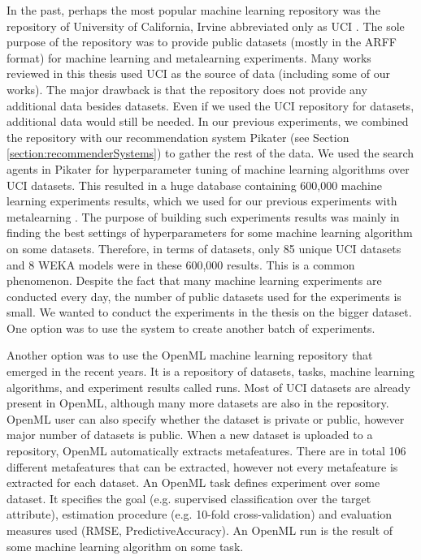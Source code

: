 In the past, perhaps the most popular machine learning repository was the repository of University of California, Irvine abbreviated only as UCI \cite{uci}. The sole purpose of the repository was to provide public datasets (mostly in the ARFF format) for machine learning and metalearning experiments. Many works reviewed in this thesis used UCI as the source of data (including some of our works). The major drawback is that the repository does not provide any additional data besides datasets. Even if we used the UCI repository for datasets, additional data would still be needed. In our previous experiments, we combined the repository with our recommendation system Pikater (see Section \ref{section:recommenderSystems}) to gather the rest of the data. We used the search agents in Pikater for hyperparameter tuning of machine learning algorithms over UCI datasets. This resulted in a huge database containing 600,000 machine learning experiments results, which we used for our previous experiments with metalearning \cite{SSCI2014}. The purpose of building such experiments results was mainly in finding the best settings of hyperparameters for some machine learning algorithm on some datasets. Therefore, in terms of datasets, only 85 unique UCI datasets and 8 WEKA models were in these 600,000 results. This is a common phenomenon. Despite the fact that many machine learning experiments are conducted every day, the number of public datasets used for the experiments is small. We wanted to conduct the experiments in the thesis on the bigger dataset. One option was to use the system to create another batch of experiments.

Another option was to use the OpenML \cite{openMl} machine learning repository that emerged in the recent years. It is a repository of datasets, tasks, machine learning algorithms, and experiment results called runs. Most of UCI datasets are already present in OpenML, although many more datasets are also in the repository. OpenML user can also specify whether the dataset is private or public, however major number of datasets is public. When a new dataset is uploaded to a repository, OpenML automatically extracts metafeatures. There are in total 106 different metafeatures that can be extracted, however not every metafeature is extracted for each dataset. An OpenML task defines experiment over some dataset. It specifies the goal (e.g. supervised classification over the target attribute), estimation procedure (e.g. 10-fold cross-validation) and evaluation measures used (RMSE, PredictiveAccuracy). An OpenML run is the result of some machine learning algorithm on some task. 

